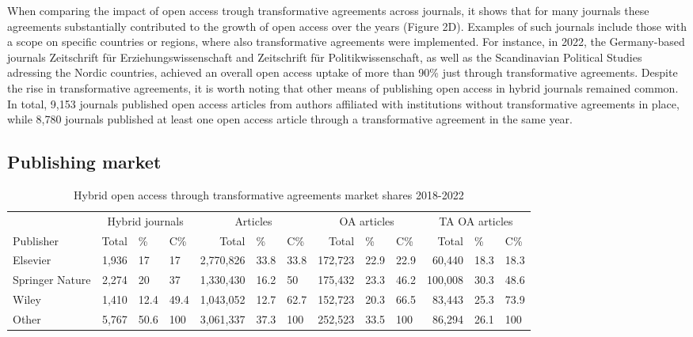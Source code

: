 \documentclass[a4paper,man,floatsintext,longtable,noextraspace,12pt]{apa6}
\begin{document}
When comparing the impact of open access trough transformative
agreements across journals, it shows that for many journals these
agreements substantially contributed to the growth of open access over
the years (Figure 2D). Examples of such journals include those with a
scope on specific countries or regions, where also transformative
agreements were implemented. For instance, in 2022, the Germany-based
journals Zeitschrift für Erziehungswissenschaft and Zeitschrift für
Politikwissenschaft, as well as the Scandinavian Political Studies
adressing the Nordic countries, achieved an overall open access uptake
of more than 90\% just through transformative agreements. Despite the
rise in transformative agreements, it is worth noting that other means
of publishing open access in hybrid journals remained common. In total,
9,153 journals published open access articles from authors affiliated
with institutions without transformative agreements in place, while
8,780 journals published at least one open access article through a
transformative agreement in the same year.

\hypertarget{publishing-market}{%
\subsection{Publishing market}\label{publishing-market}}

\begin{table}[H]

\caption{\label{tab:unnamed-chunk-5}Hybrid open access through transformative agreements market shares 2018-2022}
\centering
\fontsize{10}{12}\selectfont
\begin{tabular}[t]{lrllrllrllrll}
\toprule
\multicolumn{1}{c}{ } & \multicolumn{3}{c}{Hybrid journals} & \multicolumn{3}{c}{Articles} & \multicolumn{3}{c}{OA articles} & \multicolumn{3}{c}{TA OA articles} \\
\cmidrule(l{3pt}r{3pt}){2-4} \cmidrule(l{3pt}r{3pt}){5-7} \cmidrule(l{3pt}r{3pt}){8-10} \cmidrule(l{3pt}r{3pt}){11-13}
Publisher & Total & \% & C\% & Total & \% & C\% & Total & \% & C\% & Total & \% & C\%\\
\midrule
Elsevier & 1,936 & 17 & 17 & 2,770,826 & 33.8 & 33.8 & 172,723 & 22.9 & 22.9 & 60,440 & 18.3 & 18.3\\
Springer Nature & 2,274 & 20 & 37 & 1,330,430 & 16.2 & 50 & 175,432 & 23.3 & 46.2 & 100,008 & 30.3 & 48.6\\
Wiley & 1,410 & 12.4 & 49.4 & 1,043,052 & 12.7 & 62.7 & 152,723 & 20.3 & 66.5 & 83,443 & 25.3 & 73.9\\
Other & 5,767 & 50.6 & 100 & 3,061,337 & 37.3 & 100 & 252,523 & 33.5 & 100 & 86,294 & 26.1 & 100\\
\bottomrule
\end{tabular}
\end{table}
\end{document}

